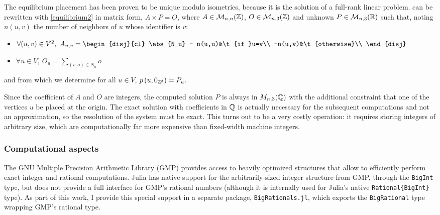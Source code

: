 \documentclass[main.tex]{subfiles}
\begin{document}
The equilibrium placement has been proven to be unique modulo isometries, because it is the solution of a full-rank linear problem\autocite{barycentric}.
 can be rewritten with \cref{equilibrium2} in matrix form, $A\times P = O$, where $A\in\mathcal{M}_{n,n}(\mathbb{Z})$, $O\in\mathcal{M}_{n,3}(\mathbb{Z})$ and unknown $P\in\mathcal{M}_{n,3}(\mathbb{R})$ such that, noting $n(u,v)$ the number of neighbors of $u$ whose identifier is $v$:
\begin{itemize}[noitemsep]
	\item $\forall (u,v)\in V^2,\ A_{u,v} = \begin{disj}{cl}
		\abs{N_u} - n(u,u)&\t{if }u=v\\
		-n(u,v)&\t{otherwise}\\
	\end{disj}$%
	\item $\forall u\in V,\ O_u = \sum\limits_{(v,o)\in N_u}o$
\end{itemize}
and from which we determine for all $u\in V$, $p\left(u, 0_{\mathbb{Z}^3}\right) = P_u$.

Since the coefficient of $A$ and $O$ are integers, the computed solution $P$ is always in $M_{n,3}(\mathbb{Q})$ with the additional constraint that one of the vertices $u$ be placed at the origin. The exact solution with coefficients in $\mathbb{Q}$ is actually necessary for the subsequent computations and not an approximation, so the resolution of the system must be exact. This turns out to be a very costly operation: it requires storing integers of arbitrary size, which are computationally far more expensive than fixed-width machine integers.

\subsubsection{Computational aspects}

The GNU Multiple Precision Arithmetic Library (GMP) \autocite{GMP} provides access to heavily optimized structures that allow to efficiently perform exact integer and rational computations. Julia has native support for the arbitrarily-sized integer structure from GMP, through the \texttt{BigInt} type, but does not provide a full interface for GMP's rational numbers (although it is internally used for Julia's native \texttt{Rational\{BigInt\}} type). As part of this work, I provide this special support in a separate package, \texttt{BigRationals.jl}, which exports the \texttt{BigRational} type wrapping GMP's rational type.
\end{document}
